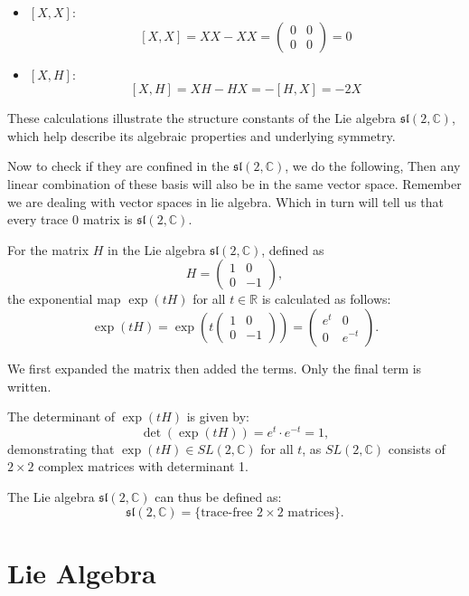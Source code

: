 \documentclass{article}
\begin{document}
\begin{itemize}
    \item \([X, X]\):
    \[
    [X, X] = XX - XX = \begin{pmatrix} 0 & 0 \\ 0 & 0 \end{pmatrix} = 0
    \]
    
    \item \([X, H]\):
    \[
    [X, H] = XH - HX = -[H, X] = -2X
    \]
\end{itemize}

These calculations illustrate the structure constants of the Lie algebra \(\mathfrak{sl}(2, \mathbb{C})\), which help describe its algebraic properties and underlying symmetry.

Now to check if they are confined in the \(\mathfrak{sl}(2, \mathbb{C})\), we do the following, Then any linear combination of these basis will also be in the same vector space. Remember we are dealing with vector spaces in lie algebra. Which in turn will tell us that every trace 0 matrix is \(\mathfrak{sl}(2, \mathbb{C})\). 

For the matrix \(H\) in the Lie algebra \(\mathfrak{sl}(2, \mathbb{C})\), defined as
\[
H = \begin{pmatrix} 1 & 0 \\ 0 & -1 \end{pmatrix},
\]
the exponential map \(\exp(tH)\) for all \(t \in \mathbb{R}\) is calculated as follows:
\[
\exp(tH) = \exp\left(t \begin{pmatrix} 1 & 0 \\ 0 & -1 \end{pmatrix}\right) = \begin{pmatrix} e^t & 0 \\ 0 & e^{-t} \end{pmatrix}.
\]

We first expanded the matrix then added the terms. Only the final term is written. 

The determinant of \(\exp(tH)\) is given by:
\[
\det(\exp(tH)) = e^t \cdot e^{-t} = 1,
\]
demonstrating that \(\exp(tH) \in SL(2, \mathbb{C})\) for all \(t\), as \(SL(2, \mathbb{C})\) consists of \(2 \times 2\) complex matrices with determinant 1.

The Lie algebra \(\mathfrak{sl}(2, \mathbb{C})\) can thus be defined as:
\[
\mathfrak{sl}(2, \mathbb{C}) = \{\text{trace-free } 2 \times 2 \text{ matrices}\}.
\]

\section{Lie Algebra}
\end{document}
